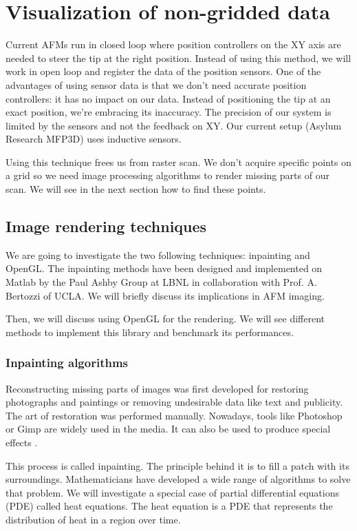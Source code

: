 \chapter{Visualization of non-gridded data}
 
Current AFMs run in closed loop where position controllers on the XY axis are needed to steer the tip at the right position. Instead of using this method, we will work in open loop and register the data of the position sensors. One of the advantages of using sensor data is that we don't need accurate position controllers: it has no impact on our data. Instead of positioning the tip at an exact position, we're embracing its inaccuracy. The precision of our system is limited by the sensors and not the feedback on XY. Our current setup (Asylum Research MFP3D) uses inductive sensors.

Using this technique frees us from raster scan. We don't acquire specific points on a grid so we need image processing algorithms to render missing parts of our scan. We will see in the next section how to find these points. 

\section{Image rendering techniques}

We are going to investigate the two following techniques: inpainting and OpenGL. The inpainting methods have been designed and implemented on Matlab by the Paul Ashby Group at LBNL in collaboration with Prof. A. Bertozzi of UCLA. We will briefly discuss its implications in AFM imaging.

Then, we will discuss using OpenGL for the rendering. We will see different methods to implement this library and benchmark its performances.


\subsection{Inpainting algorithms}

Reconstructing missing parts of images was first developed for restoring photographs and paintings or removing undesirable data like text and publicity. The art of restoration was performed manually. Nowadays, tools like Photoshop or Gimp are widely used in the media. It can also be used to produce special effects \cite{richard2001fast}.

This process is called inpainting. The principle behind it is to fill a patch with its surroundings. Mathematicians have developed a wide range of algorithms to solve that problem. We will investigate a special case of partial differential equations (PDE) called heat equations. 
The heat equation is a PDE that represents the distribution of heat in a region over time. 

